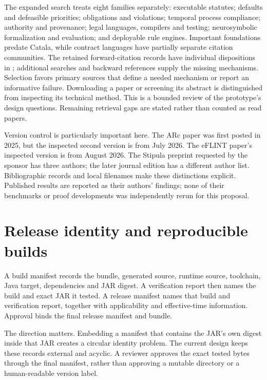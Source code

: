 The expanded search treats eight families separately: executable statutes;
defaults and defeasible priorities; obligations and violations; temporal process
compliance; authority and provenance; legal languages, compilers and testing;
neurosymbolic formalization and evaluation; and deployable rule engines. Important
foundations predate Catala, while contract languages have partially separate
citation communities. The retained forward-citation records have individual
dispositions in ; additional searches and backward
references supply the missing mechanisms. Selection favors primary sources that
define a needed mechanism or report an informative failure. Downloading a paper
or screening its abstract is distinguished from inspecting its technical method.
This is a bounded review of the prototype's design questions. Remaining retrieval
gaps are stated rather than counted as read papers.

Version control is particularly important here. The ARc paper was first posted
in 2025, but the inspected second version is from July 2026. The eFLINT paper's
inspected version is from August 2026. The Stipula preprint requested by the
sponsor has three authors; the later journal edition has a different author list.
Bibliographic records and local filenames make these distinctions explicit.
Published results are reported as their authors' findings; none of their
benchmarks or proof developments was independently rerun for this proposal.

\section{Release identity and reproducible builds}
\label{sec:release-build-record}

A build manifest records the bundle, generated source, runtime source, toolchain,
Java target, dependencies and JAR digest. A verification report then names the
build and exact JAR it tested. A release manifest names that build and verification
report, together with applicability and effective-time information. Approval
binds the final release manifest and bundle.

The direction matters. Embedding a manifest that contains the JAR's own digest
inside that JAR creates a circular identity problem. The current design keeps
these records external and acyclic. A reviewer approves the exact tested bytes
through the final manifest, rather than approving a mutable directory or a
human-readable version label.

